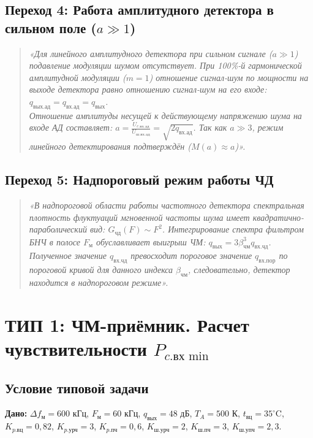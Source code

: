 \documentclass[12pt,a4paper]{article}
\begin{document}
\subsection{Переход 4: Работа амплитудного детектора в сильном поле ($a \gg 1$)}
\begin{quote}
\textit{«Для линейного амплитудного детектора при сильном сигнале ($a \gg 1$) подавление модуляции шумом отсутствует. При 100\%-й гармонической амплитудной модуляции ($m = 1$) отношение сигнал-шум по мощности на выходе детектора равно отношению сигнал-шум на его входе: $q_{\text{вых.ад}} = q_{\text{вх.ад}} = q_{\text{вых}}$.\\
Отношение амплитуды несущей к действующему напряжению шума на входе АД составляет: $a = \frac{U_{c.\text{вх.ад}}}{U_{\text{ш.вх.ад}}} = \sqrt{2 q_{\text{вх.ад}}}$. Так как $a \gg 3$, режим линейного детектирования подтверждён ($M(a) \approx a$)».}
\end{quote}

\subsection{Переход 5: Надпороговый режим работы ЧД}
\begin{quote}
\textit{«В надпороговой области работы частотного детектора спектральная плотность флуктуаций мгновенной частоты шума имеет квадратично-параболический вид: $G_{\text{чд}}(F) \sim F^2$. Интегрирование спектра фильтром БНЧ в полосе $F_{\text{м}}$ обуславливает выигрыш ЧМ: $q_{\text{вых}} = 3 \beta_{\text{чм}}^3 q_{\text{вх.чд}}$.\\
Полученное значение $q_{\text{вх.чд}}$ превосходит пороговое значение $q_{\text{вх.пор}}$ по пороговой кривой для данного индекса $\beta_{\text{чм}}$, следовательно, детектор находится в надпороговом режиме».}
\end{quote}

\newpage
\section{ТИП 1: ЧМ-приёмник. Расчет чувствительности $P_{c.\text{вх min}}$}

\subsection{Условие типовой задачи}
\textbf{Дано:} $\Delta f_{\text{м}} = 600\text{ кГц}$, $F_{\text{м}} = 60\text{ кГц}$, $q_{\text{вых}} = 48\text{ дБ}$, $T_A = 500\text{ К}$, $t_{\text{вц}} = 35^\circ\text{C}$, $K_{p.\text{вц}} = 0{,}82$, $K_{p.\text{урч}} = 3$, $K_{p.\text{пч}} = 0{,}6$, $K_{\text{ш.урч}} = 2$, $K_{\text{ш.пч}} = 3$, $K_{\text{ш.упч}} = 2{,}3$.
\end{document}
